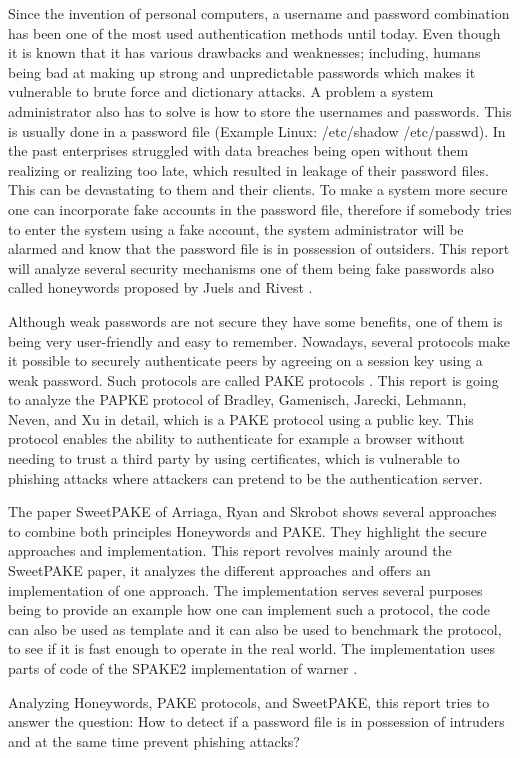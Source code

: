 \documentclass[../main.tex]{subfiles}
\begin{document}
Since the invention of personal computers, a username and password combination
has been one of the most used authentication methods until today. Even though
it is known that it has various drawbacks and weaknesses; including, humans
being bad at making up strong and unpredictable passwords which makes it
vulnerable to brute force and dictionary attacks. A problem a system
administrator also has to solve is how to store the usernames and passwords.
This is usually done in a password file (Example Linux: /etc/shadow
/etc/passwd). In the past enterprises struggled with data breaches being open
without them realizing or realizing too late, which resulted in leakage of their
password files. This can be devastating to them and their clients. To make a
system more secure one can incorporate fake accounts in the password file,
therefore if somebody tries to enter the system using a fake account, the
system administrator will be alarmed and know that the password file is in
possession of outsiders. This report will analyze several security mechanisms
one of them being fake passwords also called honeywords proposed by Juels and
Rivest \cite{juels2013honeywords}.  

Although weak passwords are not secure they have some benefits, one of them is
being very user-friendly and easy to remember. Nowadays, several protocols make
it possible to securely authenticate peers by agreeing on a session key using a
weak password. Such protocols are called PAKE protocols
\cite{bellovin1992encrypted} \cite{bellare2000authenticated}
\cite{boyko2000provably} \cite{canetti2005universally}. This report is going to
analyze the PAPKE protocol of Bradley, Gamenisch, Jarecki, Lehmann, Neven, and
Xu \cite{bradley2019password} in detail, which is a PAKE protocol using a
public key. This protocol enables the ability to authenticate for example a
browser without needing to trust a third party by using certificates, which is
vulnerable to phishing attacks where attackers can pretend to be the
authentication server.

The paper SweetPAKE of Arriaga, Ryan and Skrobot \cite{marjan2023} shows
several approaches to combine both principles Honeywords and PAKE. They
highlight the secure approaches and implementation. This report revolves mainly
around the SweetPAKE paper, it analyzes the different approaches and offers an
implementation of one approach. The implementation serves several purposes
being to provide an example how one can implement such a protocol, the code can
also be used as template and it can also be used to benchmark the protocol, to
see if it is fast enough to operate in the real world. The implementation uses
parts of code of the SPAKE2 implementation of warner \cite{Warner2016}.

Analyzing Honeywords, PAKE protocols, and SweetPAKE, this report tries to
answer the question: How to detect if a password file is in possession of
intruders and at the same time prevent phishing attacks? 
\end{document}
